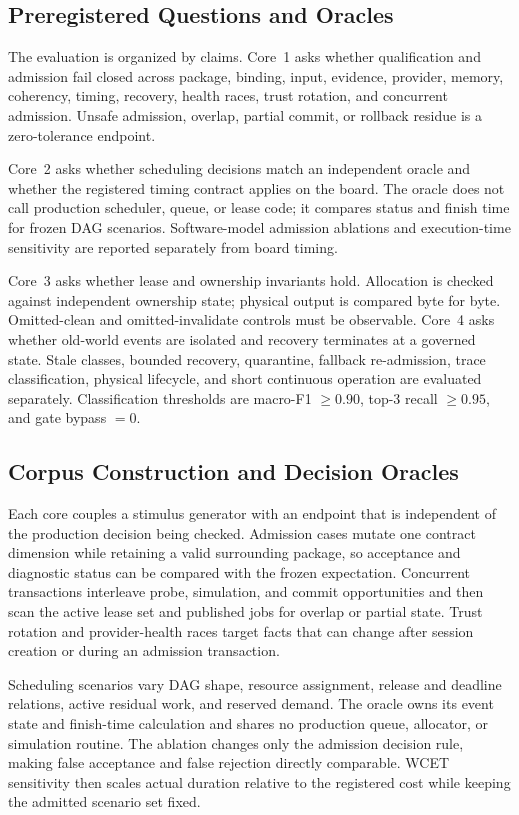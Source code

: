 \documentclass[lettersize,journal]{IEEEtran}
\begin{document}
\subsection{Preregistered Questions and Oracles}
The evaluation is organized by claims. Core~1 asks whether qualification and
admission fail closed across package, binding, input, evidence, provider,
memory, coherency, timing, recovery, health races, trust rotation, and
concurrent admission. Unsafe admission, overlap, partial commit, or rollback
residue is a zero-tolerance endpoint.

Core~2 asks whether scheduling decisions match an independent oracle and
whether the registered timing contract applies on the board. The oracle does
not call production scheduler, queue, or lease code; it compares status and
finish time for frozen DAG scenarios. Software-model admission ablations and
execution-time sensitivity are reported separately from board timing.

Core~3 asks whether lease and ownership invariants hold. Allocation is checked
against independent ownership state; physical output is compared byte for byte.
Omitted-clean and omitted-invalidate controls must be observable. Core~4 asks
whether old-world events are isolated and recovery terminates at a governed
state. Stale classes, bounded recovery, quarantine, fallback re-admission,
trace classification, physical lifecycle, and short continuous operation are
evaluated separately. Classification thresholds are macro-F1 $\ge0.90$,
top-3 recall $\ge0.95$, and gate bypass $=0$.

\subsection{Corpus Construction and Decision Oracles}
Each core couples a stimulus generator with an endpoint that is independent of
the production decision being checked. Admission cases mutate one contract
dimension while retaining a valid surrounding package, so acceptance and
diagnostic status can be compared with the frozen expectation. Concurrent
transactions interleave probe, simulation, and commit opportunities and then
scan the active lease set and published jobs for overlap or partial state.
Trust rotation and provider-health races target facts that can change after
session creation or during an admission transaction.

Scheduling scenarios vary DAG shape, resource assignment, release and
deadline relations, active residual work, and reserved demand. The oracle owns
its event state and finish-time calculation and shares no production queue,
allocator, or simulation routine. The ablation changes only the admission
decision rule, making false acceptance and false rejection directly
comparable. WCET sensitivity then scales actual duration relative to the
registered cost while keeping the admitted scenario set fixed.
\end{document}
